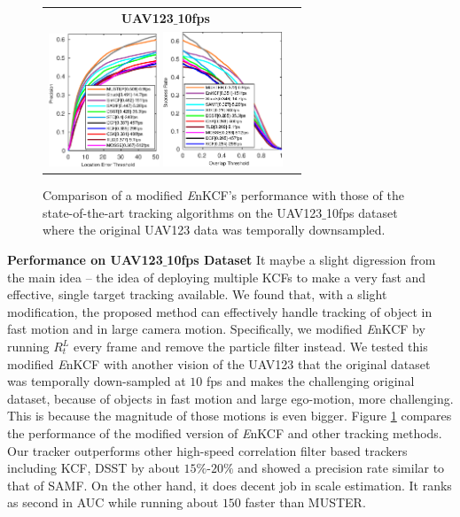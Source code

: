 \documentclass[10pt,twocolumn,letterpaper]{article}
\begin{document}
\begin{figure}[!h]
\centering
\begin{tabular}{cc}
\tiny\quad\textbf{UAV123$\_$10fps}\\
\includegraphics[width=3.30cm]{./figures/pr_uav123_10fps.eps}
\includegraphics[width=3.55cm]{./figures/sr_uav123_10fps.eps}\\
\end{tabular}
\caption{Comparison of a modified {\it E}nKCF's performance with those
  of the state-of-the-art tracking algorithms on the UAV123$\_$10fps
  dataset where the original UAV123 data was temporally downsampled.}
\label{fig:UAV123_10fpsDATASET}
\end{figure}

\textbf{Performance on UAV123$\_$10fps Dataset} It maybe a slight
digression from the main idea -- the idea of deploying multiple KCFs
to make a very fast and effective, single target tracking
available. We found that, with a slight modification, the proposed
method can effectively handle tracking of object in fast motion and in
large camera motion. Specifically, we modified {\it E}nKCF by running
$R_{t}^{L}$ every frame and remove the particle filter instead. We
tested this modified {\it E}nKCF with another vision of the UAV123 that
the original dataset was temporally down-sampled at $10$ fps and makes
the challenging original dataset, because of objects in fast motion
and large ego-motion, more challenging. This is because the magnitude
of those motions is even bigger. Figure \ref{fig:UAV123_10fpsDATASET}
compares the performance of the modified version of {\it E}nKCF and
other tracking methods. Our tracker outperforms other high-speed
correlation filter based trackers including KCF, DSST by about
$15\%$-$20\%$ and showed a precision rate similar to that of SAMF. On
the other hand, it does decent job in scale estimation. It ranks as
second in AUC while running about $150$ faster than MUSTER.
\end{document}
